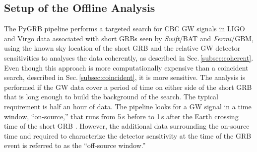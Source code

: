 \documentclass[binding=0.6cm, LaM]{sapthesis}
\begin{document}

\subsection{Setup of the Offline Analysis}
\label{subsec:pygrb}
	The {\ttfamily PyGRB} pipeline performs a targeted search for CBC GW signals in LIGO and Virgo data associated with short GRBs seen by {\it Swift}/BAT and {\it Fermi}/GBM,
        using the known sky location of the short GRB and the relative GW detector sensitivities to analyses the data coherently, as described in Sec.\,\ref{subsec:coherent}.
        Even though this approach is more computationally expensive than a coincident search, described in Sec.\,\ref{subsec:coincident},
        it is more sensitive.
	The analysis is performed if the GW data cover a period of time on either side of the short GRB that is long enough to build the background of the search.  The typical requirement is half an hour of data.
	The pipeline looks for a GW signal in a time window, ``on-source,'' that runs from 5\,s before to 1\,s 
	after the Earth crossing time of the short GRB \cite{92, 136}.
	However,
        the additional data surrounding the on-source time and required to characterize the detector sensitivity at the time of the GRB event
	is referred to as the ``off-source window.''
\end{document}
